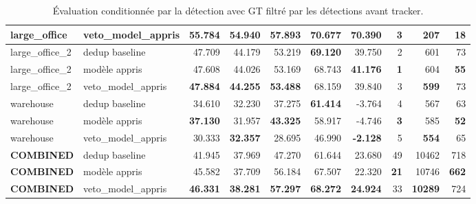 \documentclass[11pt,a4paper]{article}
\begin{document}
\begin{table}[H]
{\begin{tabular}{l l r r r r r r r r}
large\_office & veto\_model\_appris & \textbf{55.784} & \textbf{54.940} & \textbf{57.893} & 70.677 & \textbf{70.390} & 3 & \textbf{207} & 18 \\
\midrule
large\_office\_2 & dedup baseline & 47.709 & 44.179 & 53.219 & \textbf{69.120} & 39.750 & 2 & 601 & 73 \\
large\_office\_2 & modèle appris & 47.608 & 44.026 & 53.169 & 68.743 & \textbf{41.176} & \textbf{1} & 604 & \textbf{55} \\
large\_office\_2 & veto\_model\_appris & \textbf{47.884} & \textbf{44.255} & \textbf{53.488} & 68.159 & 39.840 & 3 & \textbf{599} & 73 \\
\midrule
warehouse & dedup baseline & 34.610 & 32.230 & 37.275 & \textbf{61.414} & -3.764 & 4 & 567 & 63 \\
warehouse & modèle appris & \textbf{37.130} & 31.957 & \textbf{43.325} & 58.917 & -4.746 & \textbf{3} & 585 & \textbf{52} \\
warehouse & veto\_model\_appris & 30.333 & \textbf{32.357} & 28.695 & 46.990 & \textbf{-2.128} & 5 & \textbf{554} & 65 \\
\midrule
\textbf{COMBINED} & dedup baseline & 41.945 & 37.969 & 47.270 & 61.644 & 23.680 & 49 & 10462 & 718 \\
\textbf{COMBINED} & modèle appris & 45.582 & 37.709 & 56.184 & 67.507 & 22.320 & \textbf{21} & 10746 & \textbf{662} \\
\textbf{COMBINED} & veto\_model\_appris & \textbf{46.331} & \textbf{38.281} & \textbf{57.297} & \textbf{68.272} & \textbf{24.924} & 33 & \textbf{10289} & 724 \\
\bottomrule
\end{tabular}
}
\caption{Évaluation conditionnée par la détection avec GT filtré par les détections avant tracker.}
\end{table}

\begin{table}[H]
\centering
{}
\caption{Deltas COMBINED sur filter GT. Les deltas positifs indiquent une hausse de la métrique ; pour IDSW, une valeur négative est meilleure.}
\end{table}
\end{document}
